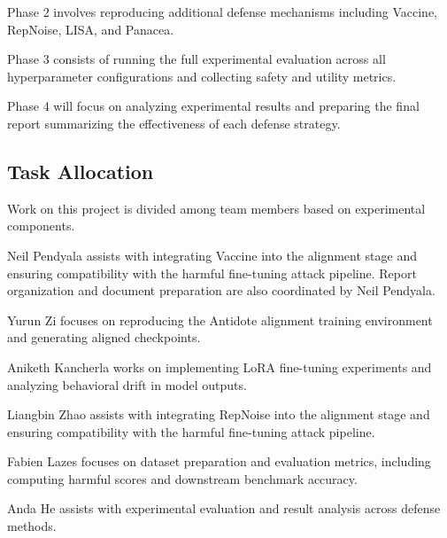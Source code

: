 \documentclass[11pt]{article}
\begin{document}
Phase 2 involves reproducing additional defense mechanisms including Vaccine, RepNoise, LISA, and Panacea.

Phase 3 consists of running the full experimental evaluation across all hyperparameter configurations and collecting safety and utility metrics.

Phase 4 will focus on analyzing experimental results and preparing the final report summarizing the effectiveness of each defense strategy.

\subsection{Task Allocation}

Work on this project is divided among team members based on experimental components.

Neil Pendyala assists with integrating Vaccine into the alignment stage and ensuring compatibility with the harmful fine-tuning attack pipeline. Report organization and document preparation are also coordinated by Neil Pendyala.

Yurun Zi focuses on reproducing the Antidote alignment training environment and generating aligned checkpoints.

Aniketh Kancherla works on implementing LoRA fine-tuning experiments and analyzing behavioral drift in model outputs.

Liangbin Zhao assists with integrating RepNoise into the alignment stage and ensuring compatibility with the harmful fine-tuning attack pipeline.

Fabien Lazes focuses on dataset preparation and evaluation metrics, including computing harmful scores and downstream benchmark accuracy.

Anda He assists with experimental evaluation and result analysis across defense methods.

%



\end{document}
